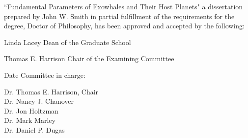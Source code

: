 \noindent ``Fundamental Parameters of Exowhales and Their Host Planets" a dissertation prepared by John W. Smith in partial fulfillment of the requirements for the degree, Doctor of Philosophy, has been approved and accepted by the following:

\singlespace

\bigskip
\begin{flushleft}
\hrulefill
\newline
Linda Lacey
\newline
Dean of the Graduate School

\vspace{0.5in}

\hrulefill
\newline
Thomas E. Harrison
\newline
Chair of the Examining Committee

\vspace{0.5in}

\hrulefill
\newline
Date
\vspace{0.5in}
\newline
Committee in charge:
\end{flushleft}

\doublespace

\indent Dr. Thomas E. Harrison, Chair\\
\indent Dr. Nancy J. Chanover\\
\indent Dr. Jon Holtzman\\
\indent Dr. Mark Marley\\
\indent Dr. Daniel P. Dugas\\
